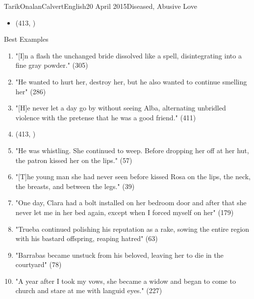 \documentclass[12pt,a4paper]{article}
\begin{document}
\begin{mla}{Tarik}{Onalan}{Calvert}{English}{20 April 2015}{Diseased, Abusive Love}
\begin{itemize}
                    violence with the pretense that he was a good friend." (411)
                \item (413, )
            \end{itemize}
            \centerline{Best Examples}
            \begin{enumerate}
                \item "[I]n a flash the unchanged bride dissolved like a spell, disintegrating
                    into a fine gray powder." (305)
                \item "He wanted to hurt her, destroy her, but he also wanted to continue
                    smelling her" (286)
                \item "[H]e never let a day go by without seeing Alba, alternating unbridled
                    violence with the pretense that he was a good friend." (411)
                \item (413, )
                \item "He was whistling. She continued to weep. Before dropping her off at
                    her hut, the patron kissed her on the lips." (57)
                \item "[T]he young man she had never seen before kissed Rosa on the lips,
                    the neck, the breasts, and between the legs." (39)
                \item "One day, Clara had a bolt installed on her bedroom door and after that
                    she never let me in her bed again, except when I forced myself on her" (179)
                \item "Trueba continued polishing his reputation as a rake, sowing the
                    entire region with his bastard offspring, reaping hatred" (63)
                \item "Barrabas became unstuck from his beloved, leaving her to die in the
                    courtyard" (78)
                \item "A year after I took my vows, she became a widow and began to come
                    to church and stare at me with languid eyes." (227)
            \end{enumerate}
        \newpage

\end{mla}
\end{document}
